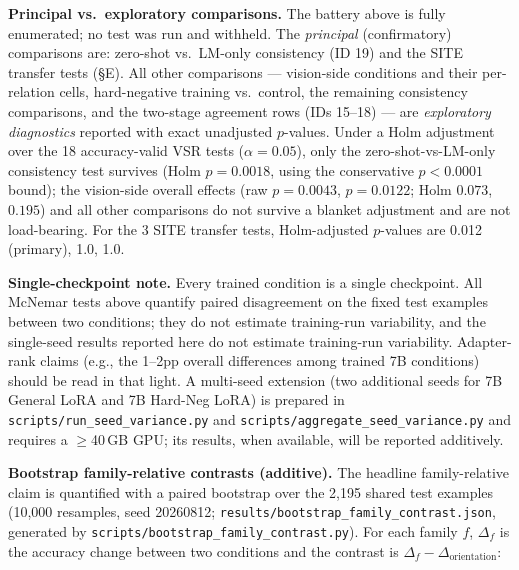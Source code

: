 \textbf{Principal vs.\ exploratory comparisons.} The battery above is fully
enumerated; no test was run and withheld. The \emph{principal}
(confirmatory) comparisons are: zero-shot vs.\ LM-only consistency (ID 19)
and the SITE transfer tests (\S E). All other comparisons --- vision-side
conditions and their per-relation cells, hard-negative training vs.\ control,
the remaining consistency comparisons, and the two-stage agreement rows
(IDs 15--18) --- are \emph{exploratory diagnostics} reported with exact
unadjusted $p$-values. Under a Holm adjustment over the 18 accuracy-valid
VSR tests ($\alpha{=}0.05$), only the zero-shot-vs-LM-only consistency test
survives (Holm $p{=}0.0018$, using the conservative $p{<}0.0001$ bound); the
vision-side overall effects (raw $p{=}0.0043$, $p{=}0.0122$; Holm $0.073$,
$0.195$) and all other comparisons do not survive a blanket adjustment and
are not load-bearing. For the 3 SITE transfer tests, Holm-adjusted $p$-values
are 0.012 (primary), 1.0, 1.0.

\textbf{Single-checkpoint note.} Every trained condition is a single
checkpoint. All McNemar tests above quantify paired disagreement on the fixed
test examples between two conditions; they do not estimate training-run
variability, and the single-seed results reported here do not estimate
training-run variability. Adapter-rank claims (e.g., the 1--2pp overall
differences among trained 7B conditions) should be read in that light. A
multi-seed extension (two additional seeds for 7B General LoRA and 7B
Hard-Neg LoRA) is prepared in \texttt{scripts/run\_seed\_variance.py} and
\texttt{scripts/aggregate\_seed\_variance.py} and requires a $\ge$40\,GB GPU;
its results, when available, will be reported additively.

\textbf{Bootstrap family-relative contrasts (additive).}
The headline family-relative claim is quantified with a paired bootstrap over
the 2,195 shared test examples (10{,}000 resamples, seed 20260812;
\texttt{results/bootstrap\_family\_contrast.json}, generated by
\texttt{scripts/bootstrap\_family\_contrast.py}). For each family $f$,
$\Delta_f$ is the accuracy change between two conditions and the contrast is
$\Delta_f - \Delta_{\mathrm{orientation}}$:

